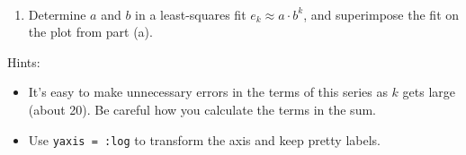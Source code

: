 \documentclass[11pt]{article}
\providecommand{\tightlist}{%
      \setlength{\itemsep}{0pt}\setlength{\parskip}{0pt}}
\begin{document}
    \begin{center}
    \end{center}
    { \hspace*{\fill} \\}
    
    \begin{enumerate}
\def\labelenumi{(\alph{enumi})}
\setcounter{enumi}{1}
\tightlist
\item
  Determine \(a\) and \(b\) in a least-squares fit
  \(e_k \approx a\cdot b^k\), and superimpose the fit on the plot from
  part (a).
\end{enumerate}

Hints:

\begin{itemize}
\tightlist
\item
  It's easy to make unnecessary errors in the terms of this series as
  \(k\) gets large (about 20). Be careful how you calculate the terms in
  the sum.
\item
  Use \texttt{yaxis\ =\ :log} to transform the axis and keep pretty
  labels.
\end{itemize}
\end{document}

